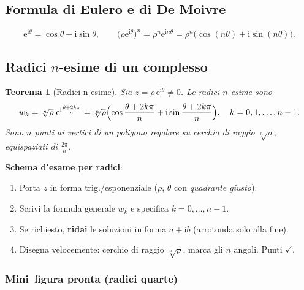 \documentclass[11pt,a4paper]{article}
\newcommand{\e}{\mathrm{e}}
\newcommand{\ii}{\mathrm{i}}
\newtheorem{theorem}{Teorema}
\theoremstyle{definition}
\begin{document}
\subsection{Formula di Eulero e di De Moivre}
\begin{defbox}
\[
\e^{\ii\theta}=\cos\theta+\ii\sin\theta,\qquad
\bigl(\rho\e^{\ii\theta}\bigr)^{n}=\rho^{n}\e^{\ii n\theta}=\rho^{n}\bigl(\cos(n\theta)+\ii\sin(n\theta)\bigr).
\]
\end{defbox}

\subsection{Radici $n$-esime di un complesso}
\begin{theorem}[Radici n-esime]
Sia $z=\rho\,\e^{\ii\theta}\neq0$. Le radici $n$-esime sono
\[
w_k=\sqrt[n]{\rho}\;\e^{\ii\frac{\theta+2k\pi}{n}}
=\sqrt[n]{\rho}\Bigl(\cos\frac{\theta+2k\pi}{n}+\ii\sin\frac{\theta+2k\pi}{n}\Bigr),\quad k=0,1,\dots,n-1.
\]
Sono $n$ punti ai vertici di un poligono regolare su cerchio di raggio $\sqrt[n]{\rho}$, equispaziati di $\frac{2\pi}{n}$.
\end{theorem}

\begin{ideabox}
\textbf{Schema d’esame per radici}:
\begin{enumerate}[(1)]
\item Porta $z$ in forma trig./esponenziale ($\rho$, $\theta$ con \emph{quadrante giusto}).
\item Scrivi la formula generale $w_k$ e specifica $k=0,\dots,n-1$.
\item Se richiesto, \textbf{ridai} le soluzioni in forma $a+\ii b$ (arrotonda solo alla fine).
\item Disegna velocemente: cerchio di raggio $\sqrt[n]{\rho}$, marca gli $n$ angoli. Punti $\checkmark$.
\end{enumerate}
\end{ideabox}

\subsubsection*{Mini–figura pronta (radici quarte)}
\begin{center}
\end{center}
\end{document}
